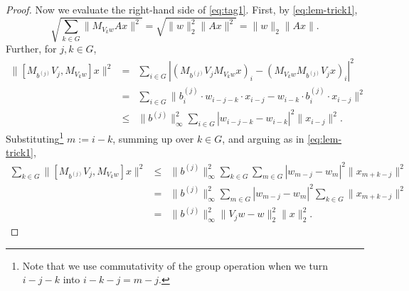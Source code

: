 \documentclass[10pt,a4paper]{amsart}
\begin{document}
\begin{proof}
Now we evaluate the right-hand side of \eqref{eq:tag1}. First, by \eqref{eq:lem-trick1},
\begin{equation} \label{eq:trick1}
\sqrt{\sum_{k\in G}\|M_{V_kw}Ax\|^2}=\sqrt{\|w\|_2^2\|Ax\|^2}=\|w\|_2\|Ax\|.%
\end{equation}
%
Further, for $j,k\in G$,
\begin{eqnarray*}
 \|[M_{b^{(j)}}V_j,M_{V_kw}]x\|^2 &=& \sum_{i\in G}|(M_{b^{(j)}}V_jM_{V_kw}x)_i-(M_{V_kw}M_{b^{(j)}}V_jx)_i|^2\\
&=& \sum_{i\in G}\|b^{(j)}_i \cdot w_{i-j-k}\cdot x_{i-j}-w_{i-k}\cdot b^{(j)}_i\cdot x_{i-j}\|^2\\
&\le& \|b^{(j)}\|_\infty^2\sum_{i\in G} |w_{i-j-k}-w_{i-k}|^2\|x_{i-j}\|^2.
\end{eqnarray*}
Substituting\footnote{Note that we use commutativity of the group operation when we turn $i-j-k$ into $i-k-j=m-j$.} $m:=i-k$, summing up over $k\in G$, and arguing as in \eqref{eq:lem-trick1},
\begin{eqnarray}
\sum_{k\in G} \|[M_{b^{(j)}}V_j,M_{V_kw}]x\|^2 &\le& \|b^{(j)}\|_\infty^2 \sum_{k\in G} \sum_{m\in G} |w_{m-j}-w_{m}|^2\|x_{m+k-j}\|^2 \nonumber\\
&=& \|b^{(j)}\|_\infty^2 \sum_{m\in G} |w_{m-j}-w_{m}|^2\sum_{k\in G} \|x_{m+k-j}\|^2\nonumber\\
&=& \|b^{(j)}\|_\infty^2 \|V_jw-w\|_2^2\|x\|_2^2.\label{eq:RHS2}
\end{eqnarray}
  

\end{proof}
\end{document}
